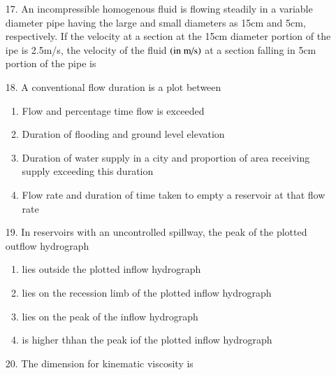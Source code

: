\documentclass[journal,12pt,onecolumn]{IEEEtran}
\theoremstyle{remark}
\begin{document}
\begin{enumerate}
\begin{multicols}{4}
            \begin{enumerate}
                \item  45.3 \columnbreak
                \item  44.7 \columnbreak
                \item  12.3 \columnbreak
                \item  11.3
            \end{enumerate}
        \end{multicols}

    \item[17.] An incompressible homogenous fluid is flowing steadily in a variable diameter pipe
        having the large and small diameters as 15cm and 5cm, respectively. If the velocity at a
        section at the 15cm diameter portion of the ipe is 2.5m/s, the velocity of the fluid 
        $\left(\textnormal{in m/s}\right)$ at a section falling in 5cm portion of the pipe is
        \hfill{}

    \item[18.] A conventional flow duration is a plot between 

        \hfill{}
        \begin{enumerate}
            \item Flow and percentage time flow is exceeded
            \item Duration of flooding and ground level elevation
            \item Duration of water supply in a city and proportion of area receiving supply exceeding
                this duration
            \item Flow rate and duration of time taken to empty a reservoir at that flow rate
        \end{enumerate}


    \item[19.] In reservoirs with an uncontrolled spillway, the peak of the plotted outflow
        hydrograph
        \hfill{}
        \begin{enumerate}
            \item lies outside the plotted inflow hydrograph
            \item lies on the recession limb of the plotted inflow hydrograph
            \item lies on the peak of the inflow hydrograph
            \item is higher thhan the peak iof the plotted inflow hydrograph
        \end{enumerate}
    \item[20.] The dimension for kinematic viscosity is 
        \hfill{}
        \begin{multicols}{4}


\end{multicols}
\end{enumerate}
\end{document}
